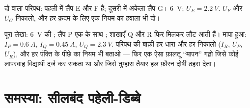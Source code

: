 \begin{exercise}[$\star\star$]\label{exo:g8:circuit-laws:11}
दो  वाला परिपथ: पहली  में लैंप E और F  हैं; दूसरी
 में अकेला लैंप G।  \qty{6}{V}; $U_E = \qty{2.2}{V}$. $U_F$
और $U_G$ निकालो, और हर क़दम के लिए एक नियम का हवाला भी दो।
\end{exercise}

\begin{exercise}[$\star\star\star$]\label{exo:g8:circuit-laws:12}
पूरा लेखा: \qty{6}{V} की ; लैंप P एक  के साथ ;
शाखाएँ Q और R फिर मिलकर लौट आती हैं। मापा हुआ: $I_P = \qty{0.6}{A}$,
$I_Q = \qty{0.45}{A}$, $U_Q = \qty{2.3}{V}$. परिपथ की बाक़ी हर धारा
और हर  निकालो ($I_R$, $U_P$, $U_R$), और हर पंक्ति के पीछे का
नियम भी बताओ --- फिर एक ऐसा फ़ालतू ``मापन'' गढ़ो जिसे कोई लापरवाह
विद्यार्थी दर्ज कर सकता था और जिसे तुम्हारा तैयार हल फ़ौरन दोषी ठहरा
देता।
\end{exercise}

\section{समस्या: सीलबंद पहेली-डिब्बे}

